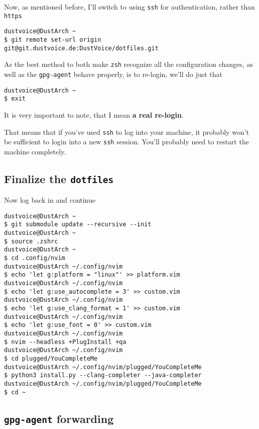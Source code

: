 \documentclass[10pt]{dustdoc}
\begin{document}
Now, as mentioned before, I’ll switch to using \texttt{ssh} for authentication, rather than \texttt{https}

\begin{verbatim}
dustvoice@DustArch ~
$ git remote set-url origin git@git.dustvoice.de:DustVoice/dotfiles.git
\end{verbatim}

As the best method to both make \texttt{zsh} recognize all the configuration changes, as well as the \texttt{gpg-agent} behave properly, is to re-login, we’ll do just that

\begin{verbatim}
dustvoice@DustArch ~
$ exit
\end{verbatim}

\begin{WARNING}
    It is very important to note, that I mean \textbf{a real re-login}.

    That means that if you’ve used \texttt{ssh} to log into your machine, it probably won’t be sufficient to login into a new \texttt{ssh} session.
    You’ll probably need to restart the machine completely.
\end{WARNING}

\subsection{Finalize the \texttt{dotfiles}}
\label{sec:finalize-the-dotfiles}

Now log back in and continue

\begin{verbatim}
dustvoice@DustArch ~
$ git submodule update --recursive --init
dustvoice@DustArch ~
$ source .zshrc
dustvoice@DustArch ~
$ cd .config/nvim
dustvoice@DustArch ~/.config/nvim
$ echo 'let g:platform = "linux"' >> platform.vim
dustvoice@DustArch ~/.config/nvim
$ echo 'let g:use_autocomplete = 3' >> custom.vim
dustvoice@DustArch ~/.config/nvim
$ echo 'let g:use_clang_format = 1' >> custom.vim
dustvoice@DustArch ~/.config/nvim
$ echo 'let g:use_font = 0' >> custom.vim
dustvoice@DustArch ~/.config/nvim
$ nvim --headless +PlugInstall +qa
dustvoice@DustArch ~/.config/nvim
$ cd plugged/YouCompleteMe
dustvoice@DustArch ~/.config/nvim/plugged/YouCompleteMe
$ python3 install.py --clang-completer --java-completer
dustvoice@DustArch ~/.config/nvim/plugged/YouCompleteMe
$ cd ~
\end{verbatim}

\subsection{\texttt{gpg-agent} forwarding}
\label{sec:gpg-agent-forwarding}
\end{document}
